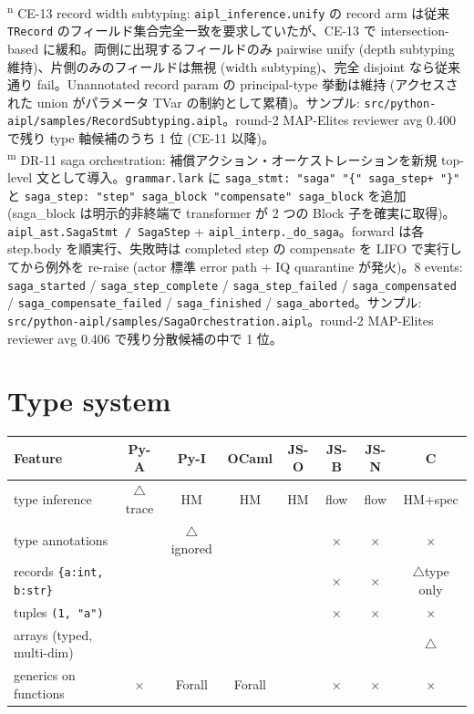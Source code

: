 \documentclass[10pt,a4paper,landscape]{article}
\newcommand{\Yes}{\textcolor{green!50!black}{\textbf{\checkmark}}}
\newcommand{\No}{\textcolor{red!70!black}{$\times$}}
\newcommand{\Part}{\textcolor{orange!80!black}{$\triangle$}}
\begin{document}
\textsuperscript{n} \small CE-13 record width subtyping: \texttt{aipl\_inference.unify} の record arm は従来 \texttt{TRecord} のフィールド集合完全一致を要求していたが、CE-13 で intersection-based に緩和。両側に出現するフィールドのみ pairwise unify (depth subtyping 維持)、片側のみのフィールドは無視 (width subtyping)、完全 disjoint なら従来通り fail。Unannotated record param の principal-type 挙動は維持 (アクセスされた union がパラメータ TVar の制約として累積)。サンプル: \texttt{src/python-aipl/samples/RecordSubtyping.aipl}。round-2 MAP-Elites reviewer avg 0.400 で残り type 軸候補のうち 1 位 (CE-11 以降)。\\
\textsuperscript{m} \small DR-11 saga orchestration: 補償アクション・オーケストレーションを新規 top-level 文として導入。\texttt{grammar.lark} に \texttt{saga\_stmt: "saga" "\{" saga\_step+ "\}"} と \texttt{saga\_step: "step" saga\_block "compensate" saga\_block} を追加 (saga\_block は明示的非終端で transformer が 2 つの Block 子を確実に取得)。\texttt{aipl\_ast.SagaStmt / SagaStep} + \texttt{aipl\_interp.\_do\_saga}。forward は各 step.body を順実行、失敗時は completed step の compensate を LIFO で実行してから例外を re-raise (actor 標準 error path + IQ quarantine が発火)。8 events: \texttt{saga\_started} / \texttt{saga\_step\_complete} / \texttt{saga\_step\_failed} / \texttt{saga\_compensated} / \texttt{saga\_compensate\_failed} / \texttt{saga\_finished} / \texttt{saga\_aborted}。サンプル: \texttt{src/python-aipl/samples/SagaOrchestration.aipl}。round-2 MAP-Elites reviewer avg 0.406 で残り分散候補の中で 1 位。

\section*{Type system}

\begin{longtable}{F C C C C C C C}
  \toprule
  \textbf{Feature} & \textbf{Py-A} & \textbf{Py-I} & \textbf{OCaml} & \textbf{JS-O} & \textbf{JS-B} & \textbf{JS-N} & \textbf{C} \\
  \midrule
  \endhead

  type inference                  & \Part trace & \Yes HM & \Yes HM & \Yes HM & \Yes flow & \Yes flow & \Yes HM+spec \\
  type annotations                & \Yes        & \Part ignored & \Yes & \Yes & \No & \No & \No \\
  records \texttt{\{a:int, b:str\}} & \Yes  & \Yes & \Yes & \Yes & \No & \No & \Part type only \\
  tuples \texttt{(1, "a")}          & \Yes  & \Yes & \Yes & \Yes  & \No  & \No  & \No  \\
  arrays (typed, multi-dim)         & \Yes  & \Yes & \Yes & \Yes & \Yes & \Yes & \Part \\
  generics on functions             & \No   & \Yes Forall & \Yes Forall & \Yes & \No & \No & \No \\
  \bottomrule
\end{longtable}
\end{document}
